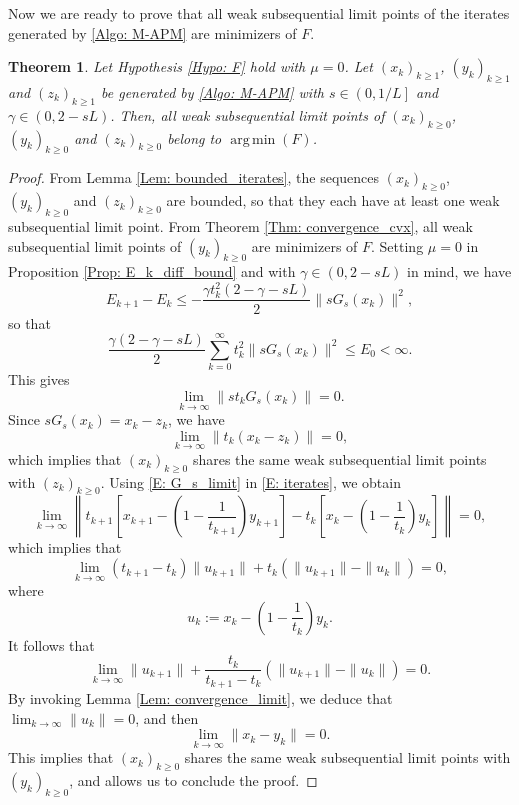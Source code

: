 \documentclass[pdflatex,sn-mathphys-num]{sn-jnl}
\theoremstyle{thmstyleone}
\newtheorem{theorem}{Theorem}
\theoremstyle{thmstyletwo}
\theoremstyle{thmstylethree}
\DeclareMathOperator*{\argmin}{arg\,min}
\begin{document}
Now we are ready to prove that all weak subsequential limit points of the iterates generated by \eqref{Algo: M-APM} are minimizers of $F$.


\begin{theorem}
Let Hypothesis \ref{Hypo: F} hold with $\mu=0$. Let $(x_k)_{k\ge 1}$, $(y_k)_{k\ge 1}$ and $(z_k)_{k\ge 1}$ be generated by \eqref{Algo: M-APM} with $s\in \left( 0, 1/L \right]$ and $\gamma\in(0,2-sL)$. Then, all weak subsequential limit points of $(x_k)_{k\ge 0}$, $(y_k)_{k\ge 0}$ and $(z_k)_{k\ge 0}$ belong to $\argmin(F)$. 
\end{theorem}


\begin{proof}
From Lemma \ref{Lem: bounded_iterates}, the sequences $(x_k)_{k\ge 0}$, $(y_k)_{k\ge 0}$ and $(z_k)_{k\ge 0}$ are bounded, so that they each have at least one weak subsequential limit point. From Theorem \ref{Thm: convergence_cvx}, all weak subsequential limit points of $(y_k)_{k\ge 0}$ are minimizers of $F$. Setting $\mu=0$ in Proposition \ref{Prop: E_k_diff_bound} and with $\gamma\in(0,2-sL)$ in mind, we have
$$ E_{k+1} - E_k \le - \frac{\gamma t_k^2(2-\gamma-sL)}{2}\| sG_s(x_k) \|^2, $$
so that
$$ \frac{\gamma(2-\gamma-sL)}{2}\sum_{k=0}^\infty t_k^2 \| sG_s(x_k) \|^2 \le E_0 < \infty. $$
This gives
\begin{equation}\label{E: G_s_limit}
\lim_{k\to\infty}\| s t_k G_s(x_k) \| = 0.
\end{equation} 
Since $sG_s(x_k) = x_k-z_k$, we have
$$ \lim_{k\to\infty} \| t_k(x_k-z_k) \| = 0, $$
which implies that $(x_k)_{k\ge 0}$ shares the same weak subsequential limit points with $(z_k)_{k\ge 0}$. Using \eqref{E: G_s_limit} in \eqref{E: iterates}, we obtain
$$ \lim_{k\to\infty} \left\| t_{k+1}\left[ x_{k+1}-\left( 1 - \frac{1}{t_{k+1}} \right)y_{k+1} \right] - t_k\left[ x_k-\left( 1 - \frac{1}{t_k} \right)y_k \right] \right\| = 0, $$
which implies that
$$ \lim_{k\to\infty} (t_{k+1}-t_k)\| u_{k+1} \| + t_k\left( \| u_{k+1} \| - \| u_k \| \right) = 0, $$
where
$$ u_k := x_k-\left( 1 - \frac{1}{t_k} \right)y_k.$$
It follows that
$$ \lim_{k\to\infty} \| u_{k+1} \| + \frac{t_k}{t_{k+1}-t_k}\left( \| u_{k+1} \| - \| u_k \| \right) = 0. $$
By invoking Lemma \ref{Lem: convergence_limit}, we deduce that $\lim_{k\to\infty} \| u_k \| = 0$, and then
$$ \lim_{k\to\infty}\| x_k-y_k \| = 0. $$
This implies that $(x_k)_{k\ge 0}$ shares the same weak subsequential limit points with $(y_{k})_{k\ge 0}$, and allows us to conclude the proof.
\end{proof}
\end{document}
